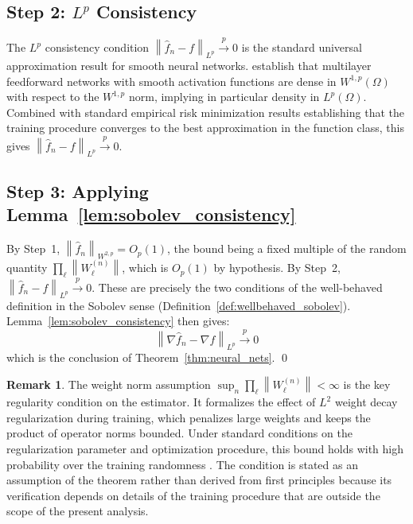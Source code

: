 \documentclass[12pt,a4paper]{article}
\numberwithin{equation}{section}
\theoremstyle{plain}
\theoremstyle{definition}
\newtheorem{remark}{Remark}
\newcommand{\norm}[1]{\left\| #1 \right\|}
\newcommand{\fn}{\hat{f}_n}
\newcommand{\xrightarrowp}{\xrightarrow{p}}
\begin{document}
	\subsection{Step 2: $L^p$ Consistency}
	
	The $L^p$ consistency condition $\norm{\fn - f}_{L^p} \xrightarrowp 0$ is
	the standard universal approximation result for smooth neural networks.
	\citet{hornik1990universal} establish that multilayer feedforward networks
	with smooth activation functions are dense in $W^{1,p}(\Omega)$ with respect
	to the $W^{1,p}$ norm, implying in particular density in $L^p(\Omega)$.
	Combined with standard empirical risk minimization results establishing that
	the training procedure converges to the best approximation in the function
	class, this gives $\norm{\fn - f}_{L^p} \xrightarrowp 0$.
	
	\subsection{Step 3: Applying Lemma~\ref{lem:sobolev_consistency}}
	
	By Step~1, $\norm{\fn}_{W^{2,p}} = O_p(1)$, the bound being a fixed multiple
	of the random quantity $\prod_\ell \norm{W_\ell^{(n)}}$, which is $O_p(1)$
	by hypothesis. By Step~2,
	$\norm{\fn - f}_{L^p} \xrightarrowp 0$. These are precisely the two
	conditions of the well-behaved definition in the Sobolev sense
	(Definition~\ref{def:wellbehaved_sobolev}). Lemma~\ref{lem:sobolev_consistency}
	then gives:
	\begin{equation}
		\norm{\nabla \fn - \nabla f}_{L^p} \xrightarrowp 0
	\end{equation}
	which is the conclusion of Theorem~\ref{thm:neural_nets}. 
	\qed
	
	\begin{remark}
		The weight norm assumption $\sup_n \prod_\ell \norm{W_\ell^{(n)}} < \infty$
		is the key regularity condition on the estimator. It formalizes the effect
		of $L^2$ weight decay regularization during training, which penalizes large
		weights and keeps the product of operator norms bounded. Under standard
		conditions on the regularization parameter and optimization procedure,
		this bound holds with high probability over the training randomness
		\citep{bartlett2017spectrally}. The condition is stated as an assumption
		of the theorem rather than derived from first principles because its
		verification depends on details of the training procedure that are outside
		the scope of the present analysis.
	\end{remark}
	
\end{document}
